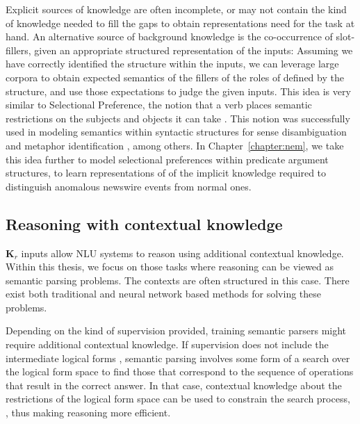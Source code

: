 Explicit sources of knowledge are often incomplete, or may not contain the kind of knowledge needed
to fill the gaps to obtain representations need for the task at hand.  An alternative source of
background knowledge is the co-occurrence of slot-fillers, given an appropriate structured
representation of the inputs: Assuming we have correctly identified the structure within the inputs,
we can leverage large corpora to obtain expected semantics of the fillers of the roles of defined by
the structure, and use those expectations to judge the given inputs.  This idea is very similar to
Selectional Preference, the notion that a verb places semantic restrictions on the subjects and
objects it can take \citep{katz1963structure,wilks1975preferential}.  This notion was successfully
used in modeling semantics within syntactic structures for sense disambiguation
\citep{resnik1997selectional} and metaphor identification \citep{shutova2013statistical}, among
others.  In Chapter~\ref{chapter:nem}, we take this idea further to model selectional preferences
within predicate argument structures, to learn representations of of the implicit knowledge required
to distinguish anomalous newswire events from normal ones.

\subsection{Reasoning with contextual knowledge} $\textbf{K}_r$ inputs allow NLU systems to reason
using additional contextual knowledge. Within this thesis, we focus on those tasks where reasoning
can be viewed as semantic parsing problems.  The contexts are often structured in this case. There
exist both traditional \citep[among
others]{Zelle1996LearningTP,Zettlemoyer2005LearningTM,zettlemoyer2007online} and neural network
based methods
\citep{Dong2016LanguageTL,Andreas2016LearningTC,Liang2016NeuralSM,Neelakantan2016LearningAN} for
solving these problems. 

Depending on the kind of supervision provided, training semantic parsers might require additional
contextual knowledge. If supervision does not include the intermediate logical forms
\citep{berant2013semantic,pasupat2015compositional,krishnamurthy2017neural}, semantic parsing
involves some form of a search over the logical form space to find those that correspond to the
sequence of operations that result in the correct answer.  In that case, contextual knowledge about
the restrictions of the logical form space can be used to constrain the search process,
\citep{xiao2016sequence,krishnamurthy2017neural}, thus making reasoning more efficient.


